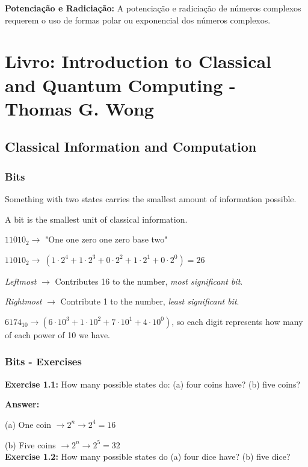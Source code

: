 \documentclass[12pt]{article}
\begin{document}
\textbf{Potenciação e Radiciação:} A potenciação e radiciação de números complexos requerem o uso de formas polar ou exponencial dos números complexos.

\newpage
\section{Livro: Introduction to Classical and Quantum Computing - Thomas G. Wong}

\subsection{Classical Information and Computation}

\subsubsection{Bits}

Something with two states carries the smallest amount of information possible.

A bit is the smallest unit of classical information.

\(11010_{2} \rightarrow\) "One one zero one zero base two"

\(11010_{2} \rightarrow\ (1 \cdot 2^{4}+1 \cdot 2^{3}+0 \cdot 2^{2}+1 \cdot 2^{1}+0 \cdot 2^0) = 26\)

\textit{Leftmost} \(\rightarrow\) Contributes 16 to the number, \textit{most significant bit}.

\textit{Rightmost} \(\rightarrow\) Contribute 1 to the number, \textit{least significant bit}.

\(6174_{10} \rightarrow (6 \cdot 10^{3}+1 \cdot 10^{2}+7 \cdot 10^{1}+4 \cdot 10^{0})\), so each digit represents how many of each power of 10 we have.

\subsubsection{Bits - Exercises}

\textbf{Exercise 1.1:} How many possible states do: (a) four coins have? (b) five coins?

\textbf{Answer:}

(a) One coin \(\rightarrow 2^{n} \rightarrow 2^{4} = 16\)

(b) Five coins \(\rightarrow 2^{n} \rightarrow 2^{5} = 32\)\\

\textbf{Exercise 1.2:} How many possible states do (a) four dice have? (b) five dice?
\end{document}
